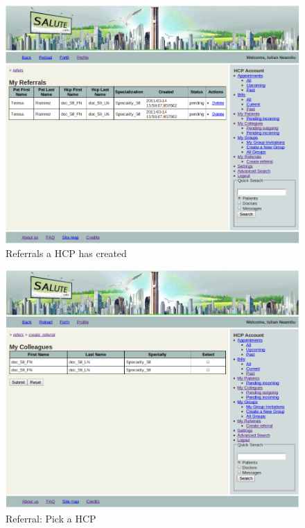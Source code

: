 \begin{figure}
\includegraphics[scale=0.5]{screenshots/my_referrals.png}
\caption{Referrals a HCP has created}
\end{figure}

\begin{figure}
\includegraphics[scale=0.5]{screenshots/referral_pick_my_collegues.png}
\caption{Referral: Pick a HCP}
\end{figure}

